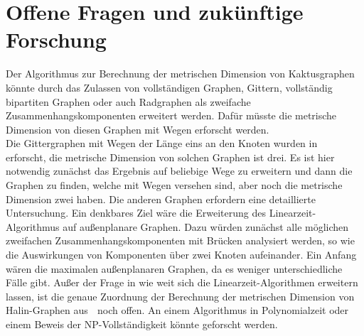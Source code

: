 \section{Offene Fragen und zukünftige Forschung}
\vspace{-2mm}
Der Algorithmus zur Berechnung der metrischen Dimension von Kaktusgraphen könnte durch das Zulassen von vollständigen Graphen, Gittern, vollständig bipartiten Graphen oder auch Radgraphen als zweifache Zusammenhangskomponenten erweitert werden. Dafür müsste die metrische Dimension von diesen Graphen mit Wegen erforscht werden.\\ Die Gittergraphen mit Wegen der Länge eins an den Knoten wurden in \grqq$\;$\cite{grid} erforscht, die metrische Dimension von solchen Graphen ist drei. Es ist hier notwendig zunächst das Ergebnis auf beliebige Wege zu erweitern und dann die Graphen zu finden, welche mit Wegen versehen sind, aber noch die metrische Dimension zwei haben. Die anderen Graphen erfordern eine detaillierte Untersuchung.
\vspace{-1.5mm}\newline\newline
Ein denkbares Ziel wäre die Erweiterung des Linearzeit-Algorithmus auf außenplanare Graphen. Dazu würden zunächst alle möglichen zweifachen Zusammenhangskomponenten mit Brücken analysiert werden, so wie die Auswirkungen von Komponenten über zwei Knoten aufeinander. Ein Anfang wären die maximalen außenplanaren Graphen, da es weniger unterschiedliche Fälle gibt.
\vspace{-1.5mm}\newline\newline
Außer der Frage in wie weit sich die Linearzeit-Algorithmen erweitern lassen, ist die genaue Zuordnung der Berechnung der metrischen Dimension von Halin-Graphen aus \grqq$\;$\cite{halin} noch offen. An einem Algorithmus in Polynomialzeit oder einem Beweis der NP-Vollständigkeit könnte geforscht werden.


\clearpage


\clearpage
\listoffigures
\listoftables

